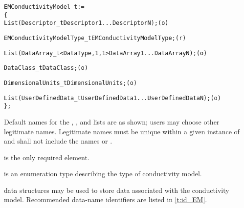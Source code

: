 \begin{alltt}
  EMConductivityModel\_t :=
    \{
    List( Descriptor\_t Descriptor1 ... DescriptorN ) ;                      (o)

    EMConductivityModelType\_t EMConductivityModelType ;                     (r)
    
    List( DataArray\_t<DataType, 1, 1> DataArray1 ... DataArrayN ) ;         (o)

    DataClass\_t DataClass ;                                                 (o)
                
    DimensionalUnits\_t DimensionalUnits ;                                   (o)

    List( UserDefinedData\_t UserDefinedData1 ... UserDefinedDataN ) ;       (o)
    \} ;
\end{alltt}

\begin{notes}
\item Default names for the , , and
      lists are as shown; users may choose other legitimate names.
      Legitimate names must be unique within a given instance of
       and shall not include the names
       or .
\item {} is the only required element.
\end{notes}

 is an enumeration type describing
the type of conductivity model.

 data structures may be used to store data associated
with the conductivity model.
Recommended data-name identifiers are listed in \autoref{t:id_EM}.

